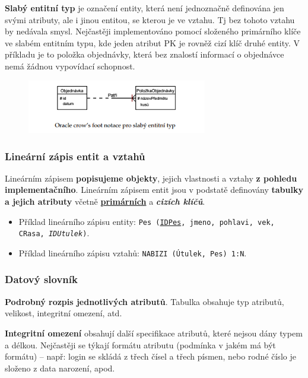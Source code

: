 \textbf{Slabý entitní typ} je označení entity, která není jednoznačně definována jen svými atributy, ale i jinou entitou, se kterou je ve vztahu. Tj bez tohoto vztahu by nedávala smysl. Nejčastěji implementováno pomocí složeného primárního klíče ve slabém entitním typu, kde jeden atribut PK je rovněž cizí klíč druhé entity. V příkladu je to položka objednávky, která bez znalostí informací o objednávce nemá žádnou vypovídací schopnost.

\begin{figure}[H]
	\centering
	\includegraphics[width=0.7\textwidth]{assets/erdiagram_slaby_entitni_typ.png}
\end{figure}

\subsubsection{Lineární zápis entit a vztahů}
Lineárním zápisem \textbf{popisujeme objekty}, jejich vlastnosti a vztahy \textbf{z pohledu implementačního}. Lineárním zápisem entit jsou v podstatě definovány \textbf{tabulky a jejich atributy} včetně \underline{\textbf{primárních}} a \textbf{\textit{cizích klíčů}}. 

\begin{itemize}
\item Příklad lineárního zápisu entity: \texttt{Pes (\underline{IDPes}, jmeno, pohlavi, vek, CRasa, \textit{IDUtulek})}.
\item Příklad lineárního zápisu vztahů: \texttt{NABIZI (Útulek, Pes) 1:N}.
\end{itemize}

\subsubsection{Datový slovník}
\textbf{Podrobný rozpis jednotlivých atributů}. Tabulka obsahuje typ atributů, velikost, integritní omezení, atd. 

\textbf{Integritní omezení} obsahují další specifikace atributů, které nejsou dány typem a délkou. Nejčastěji se týkají formátu atributu (podmínka v jakém má být formátu) -- např: login se skládá z třech čísel a třech písmen, nebo rodné číslo je složeno z data narození, apod.


